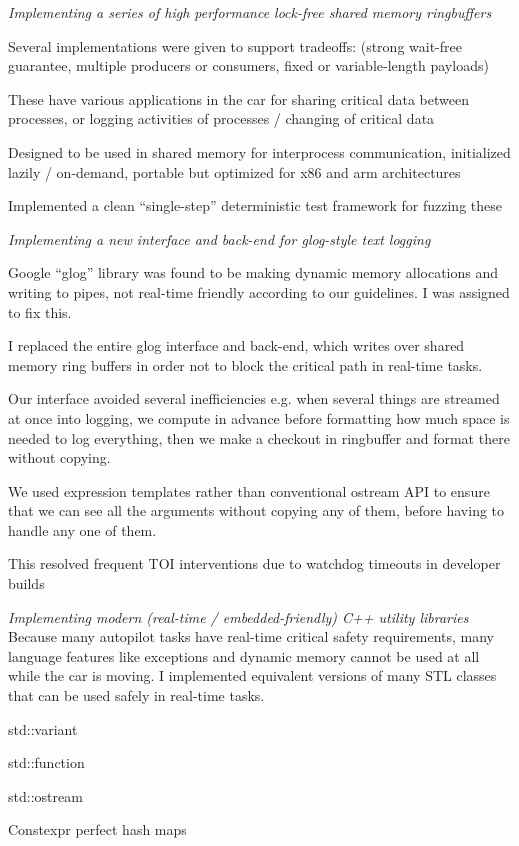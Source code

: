 \documentclass[margin,line]{resume}
\begin{document}
\begin{resume}
    \textsl{Implementing a series of high performance lock-free shared memory ringbuffers}
    \begin{list2}
    \item{Several implementations were given to support tradeoffs: (strong wait-free guarantee, multiple producers or consumers, fixed or variable-length payloads)}
    \item{These have various applications in the car for sharing critical data between processes, or logging activities of processes / changing of critical data}
    \item{Designed to be used in shared memory for interprocess communication, initialized lazily / on-demand, portable but optimized for x86 and arm architectures}
    \item{Implemented a clean ``single-step'' deterministic test framework for fuzzing these}
    \end{list2}
    \textsl{Implementing a new interface and back-end for glog-style text logging}
    \begin{list2}
    \item Google ``glog'' library was found to be making dynamic memory allocations and writing to pipes, not real-time friendly
    according to our guidelines. I was assigned to fix this.
    \item I replaced the entire glog interface and back-end, which writes over shared memory ring buffers in order not to block the critical
    path in real-time tasks.
    \item Our interface avoided several inefficiencies e.g. when several things are streamed at once into logging, we compute in advance before
    formatting how much space is needed to log everything, then we make a checkout in ringbuffer and format there without copying.
    \item We used expression templates rather than conventional ostream API to ensure that we can see all the arguments without copying any of them,
    before having to handle any one of them.
    \item This resolved frequent TOI interventions due to watchdog timeouts in developer builds
    \end{list2}

    \textsl{Implementing modern (real-time / embedded-friendly) C++ utility libraries} \\
    Because many autopilot tasks have real-time critical safety requirements, many language features like exceptions
    and dynamic memory cannot be used at all while the car is moving. I implemented equivalent versions of many STL
    classes that can be used safely in real-time tasks.
    \begin{list2}
    \item std::variant
    \item std::function
    \item std::ostream
    \item Constexpr perfect hash maps
    \end{list2}


\end{resume}
\end{document}
